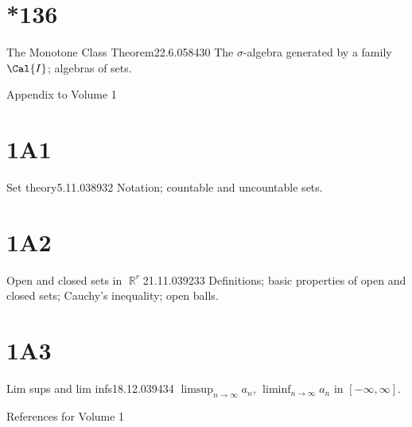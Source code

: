 \section{*136}{The Monotone Class Theorem}{22.6.05}{84}{30}
{The $\sigma$-algebra generated by a family $\Cal{I}$;
algebras of sets.}

\medskip

 Appendix to Volume 1


\section{1A1}{Set theory}{5.11.03}{89}{32}
{Notation;  countable and uncountable sets.}

\section{1A2}{Open and closed sets in $\BbbR^r$}{21.11.03}{92}{33}
{Definitions;  basic properties of open and closed sets;  Cauchy's
inequality;  open balls.}

\section{1A3}{Lim sups and lim infs}{18.12.03}{94}{34}
{$\limsup_{n\to\infty}a_n$, $\liminf_{n\to\infty}a_n$ in
$[-\infty,\infty]$.}



\medskip

References for Volume 1 

     
     
     
     
